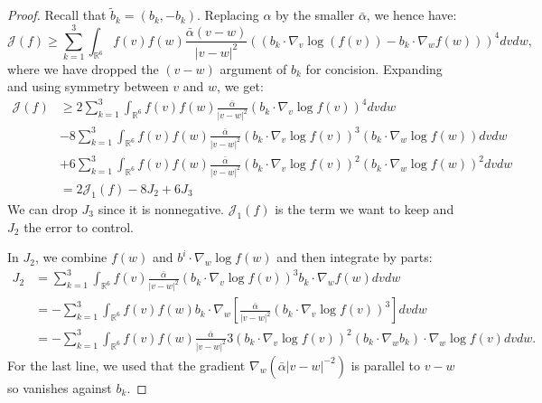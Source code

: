\documentclass[11pt,a4paper]{article}
\theoremstyle{definition}
\theoremstyle{plain}
\begin{document}
\begin{proof}
    Recall that $\tilde{b}_k=(b_k,-b_k)$. Replacing $\alpha$ by the smaller $\bar{\alpha}$, we hence have:
    $$\mathcal{J}(f)\geq \sum_{k=1}^3  \int_{\mathbb{R}^{6}}f(v)f(w)  \frac{\bar{\alpha}(v-w)}{\vert v - w\vert^2} \left( (b_k\cdot \nabla_v\log (f(v)) - b_k \cdot \nabla_w f(w)) \right)^4 dvdw,$$
    where we have dropped the $(v-w)$ argument of $b_k$ for concision.
    Expanding and using symmetry between $v$ and $w$, we get:
    \begin{align*}  
    \mathcal{J}(f)&\geq   2\sum_{k=1}^3\int_{\mathbb{R}^{6}}f(v)f(w)  \frac{\bar{\alpha}}{\vert v - w\vert^2} \left( b_k\cdot \nabla_v\log f(v) \right)^4 dvdw\\
    &-8\sum_{k=1}^3\int_{\mathbb{R}^{6}}f(v)f(w)  \frac{\bar{\alpha}}{\vert v - w\vert^2} \left( b_k\cdot \nabla_v\log f(v) \right)^3 \left(b_k\cdot \nabla_w\log f(w)\right) dvdw\\
    &+6\sum_{k=1}^3\int_{\mathbb{R}^{6}}f(v)f(w)  \frac{\bar{\alpha}}{\vert v - w\vert^2} \left( b_k\cdot \nabla_v\log f(v) \right)^2 \left( b_k\cdot \nabla_w\log f(w) \right)^2 dvdw\\
    &=2\mathcal{J}_1(f) - 8J_2 +6J_3
    \end{align*}
    We can drop $J_3$ since it is nonnegative. $\mathcal{J}_1(f)$ is the term we want to keep and $J_2$ the error to control.

    In $J_2$, we combine $f(w)$ and $b^i\cdot \nabla_w\log f(w)$ and then integrate by parts:
    \begin{align*} 
        J_2&=\sum_{k=1}^3\int_{\mathbb{R}^{6}}f(v) \frac{\bar{\alpha}}{\vert v - w\vert^2} \left( b_k\cdot \nabla_v\log f(v) \right)^3 b_k\cdot \nabla_w f(w) dvdw\\
        &=-\sum_{k=1}^3\int_{\mathbb{R}^{6}}f(v)f(w)  b_k\cdot \nabla_w \left[\frac{\bar{\alpha}}{\vert v - w\vert^2} \left( b_k\cdot \nabla_v\log f(v) \right)^3\right] dvdw\\
        &=-\sum_{k=1}^3\int_{\mathbb{R}^{6}}f(v)f(w)  \frac{\bar{\alpha}}{\vert v - w\vert^2} 3\left( b_k\cdot \nabla_v\log f(v) \right)^2(b_k\cdot \nabla_w b_k)\cdot\nabla_w \log f(v) dvdw.
    \end{align*}
    For the last line, we used that the gradient $\nabla_w (\bar{\alpha}\vert v-w\vert^{-2} )$ is parallel to $v-w$ so vanishes against $b_k$.


\end{proof}
\end{document}
